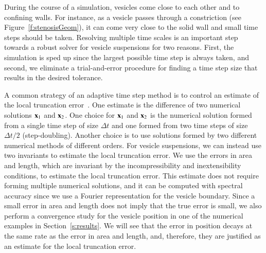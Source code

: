 During the course of a simulation, vesicles come close to each other and
to confining walls.  For instance, as a vesicle passes through a
constriction (see Figure~\ref{f:stenosisGeom}), it can come very close
to the solid wall and small time steps should be taken.  Resolving
multiple time scales is an important step towards a robust solver for
vesicle suspensions for two reasons.  First, the simulation is sped up
since the largest possible time step is always taken, and second, we
eliminate a trial-and-error procedure for finding a time step size that
results in the desired tolerance.

A common strategy of an adaptive time step method is to control an
estimate of the local truncation error~\cite{chr:mac:ong:spi2014,
hai:nor:wan1993, hai:wan1996}.  One estimate is the difference of two
numerical solutions ${\mathbf{x}}_{1}$ and ${\mathbf{x}}_{2}$.  One choice for ${\mathbf{x}}_{1}$
and ${\mathbf{x}}_{2}$ is the numerical solution formed from a single time step
of size $\Delta t$ and one formed from two time steps of size $\Delta
t/2$ (step-doubling).  Another choice is to use solutions formed by two
different numerical methods of different orders.  For vesicle
suspensions, we can instead use two invariants to estimate the local
truncation error.  We use the errors in area and length, which are
invariant by the incompressibility and inextensibility conditions, to
estimate the local truncation error.  This estimate does not require
forming multiple numerical solutions,  and it can be computed with
spectral accuracy since we use a Fourier representation for the vesicle
boundary.  Since a small error in area and length does not imply that
the true error is small, we also perform a convergence study for the
vesicle position in one of the numerical examples in
Section~\ref{s:results}.  We will see that the error in position decays
at the same rate as the error in area and length, and, therefore, they
are justified as an estimate for the local truncation error.

